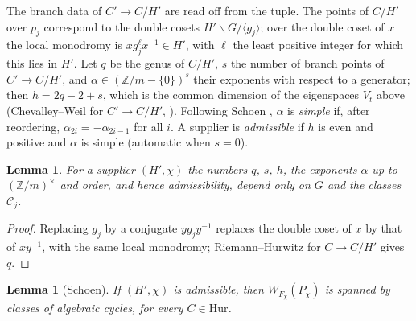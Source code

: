\documentclass[11pt]{amsart}
\newtheorem{lemma}[theorem]{Lemma}
\theoremstyle{definition}
\theoremstyle{remark}
\newcommand{\Z}{\mathbb Z}
\newcommand{\cH}{\mathrm{Hur}}
\begin{document}
The branch data of $C'\to C/H'$ are read off from the tuple. The points of $C/H'$ over $p_j$ correspond to the double cosets $H'\backslash G/\langle g_j\rangle$; over the double coset of $x$ the local monodromy is $xg_j^\ell x^{-1}\in H'$, with $\ell$ the least positive integer for which this lies in $H'$. Let $q$ be the genus of $C/H'$, $s$ the number of branch points of $C'\to C/H'$, and $\alpha\in(\Z/m-\{0\})^s$ their exponents with respect to a generator; then $h=2q-2+s$, which is the common dimension of the eigenspaces $V_t$ above (Chevalley--Weil for $C'\to C/H'$, \cite[Lemma~1.5]{Schoen88}). Following Schoen \cite[\S1]{Schoen88}, $\alpha$ is \emph{simple} if, after reordering, $\alpha_{2i}=-\alpha_{2i-1}$ for all $i$. A supplier is \emph{admissible} if $h$ is even and positive and $\alpha$ is simple (automatic when $s=0$).

\begin{lemma}\label{lem:classdatum}
For a supplier $(H',\chi)$ the numbers $q$, $s$, $h$, the exponents $\alpha$ up to $(\Z/m)^\times$ and order, and hence admissibility, depend only on $G$ and the classes $\mathcal C_j$.
\end{lemma}

\begin{proof}
Replacing $g_j$ by a conjugate $yg_jy^{-1}$ replaces the double coset of $x$ by that of $xy^{-1}$, with the same local monodromy; Riemann--Hurwitz for $C\to C/H'$ gives $q$.
\end{proof}

\begin{lemma}[Schoen]\label{lem:schoen}
If $(H',\chi)$ is admissible, then $W_{F_\chi}(P_\chi)$ is spanned by classes of algebraic cycles, for every $C\in\cH$.
\end{lemma}
\end{document}
